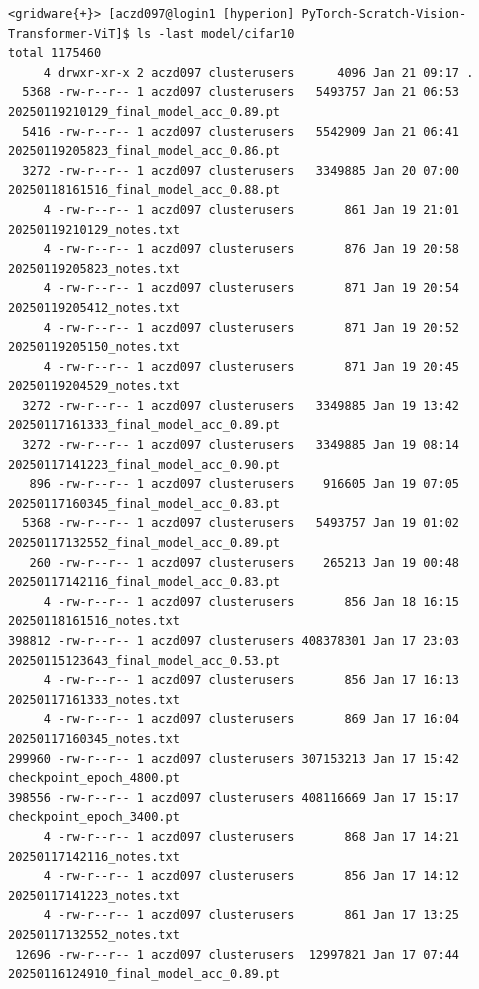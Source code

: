 \begin{verbatim}
<gridware{+}> [aczd097@login1 [hyperion] PyTorch-Scratch-Vision-Transformer-ViT]$ ls -last model/cifar10
total 1175460
     4 drwxr-xr-x 2 aczd097 clusterusers      4096 Jan 21 09:17 .
  5368 -rw-r--r-- 1 aczd097 clusterusers   5493757 Jan 21 06:53 20250119210129_final_model_acc_0.89.pt
  5416 -rw-r--r-- 1 aczd097 clusterusers   5542909 Jan 21 06:41 20250119205823_final_model_acc_0.86.pt
  3272 -rw-r--r-- 1 aczd097 clusterusers   3349885 Jan 20 07:00 20250118161516_final_model_acc_0.88.pt
     4 -rw-r--r-- 1 aczd097 clusterusers       861 Jan 19 21:01 20250119210129_notes.txt
     4 -rw-r--r-- 1 aczd097 clusterusers       876 Jan 19 20:58 20250119205823_notes.txt
     4 -rw-r--r-- 1 aczd097 clusterusers       871 Jan 19 20:54 20250119205412_notes.txt
     4 -rw-r--r-- 1 aczd097 clusterusers       871 Jan 19 20:52 20250119205150_notes.txt
     4 -rw-r--r-- 1 aczd097 clusterusers       871 Jan 19 20:45 20250119204529_notes.txt
  3272 -rw-r--r-- 1 aczd097 clusterusers   3349885 Jan 19 13:42 20250117161333_final_model_acc_0.89.pt
  3272 -rw-r--r-- 1 aczd097 clusterusers   3349885 Jan 19 08:14 20250117141223_final_model_acc_0.90.pt
   896 -rw-r--r-- 1 aczd097 clusterusers    916605 Jan 19 07:05 20250117160345_final_model_acc_0.83.pt
  5368 -rw-r--r-- 1 aczd097 clusterusers   5493757 Jan 19 01:02 20250117132552_final_model_acc_0.89.pt
   260 -rw-r--r-- 1 aczd097 clusterusers    265213 Jan 19 00:48 20250117142116_final_model_acc_0.83.pt
     4 -rw-r--r-- 1 aczd097 clusterusers       856 Jan 18 16:15 20250118161516_notes.txt
398812 -rw-r--r-- 1 aczd097 clusterusers 408378301 Jan 17 23:03 20250115123643_final_model_acc_0.53.pt
     4 -rw-r--r-- 1 aczd097 clusterusers       856 Jan 17 16:13 20250117161333_notes.txt
     4 -rw-r--r-- 1 aczd097 clusterusers       869 Jan 17 16:04 20250117160345_notes.txt
299960 -rw-r--r-- 1 aczd097 clusterusers 307153213 Jan 17 15:42 checkpoint_epoch_4800.pt
398556 -rw-r--r-- 1 aczd097 clusterusers 408116669 Jan 17 15:17 checkpoint_epoch_3400.pt
     4 -rw-r--r-- 1 aczd097 clusterusers       868 Jan 17 14:21 20250117142116_notes.txt
     4 -rw-r--r-- 1 aczd097 clusterusers       856 Jan 17 14:12 20250117141223_notes.txt
     4 -rw-r--r-- 1 aczd097 clusterusers       861 Jan 17 13:25 20250117132552_notes.txt
 12696 -rw-r--r-- 1 aczd097 clusterusers  12997821 Jan 17 07:44 20250116124910_final_model_acc_0.89.pt
 






\end{verbatim}

